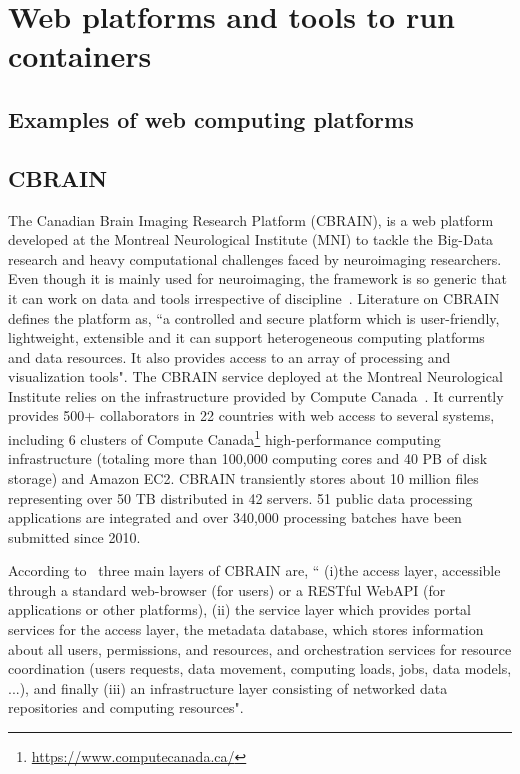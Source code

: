 \section{Web platforms and tools to run containers}
\subsection{Examples of web computing platforms}
\subsection{CBRAIN}
The Canadian Brain Imaging Research Platform (CBRAIN), is a web platform developed at the Montreal Neurological Institute (MNI) to tackle the Big-Data research and heavy computational challenges faced by neuroimaging researchers. Even though it is mainly used for neuroimaging, the framework is so generic that it can work on data and tools irrespective of discipline~\cite{DBLP:journals/fini/DasGRSPMSRSKMKR17}. Literature on CBRAIN~\cite{DBLP:journals/fini/DasGRSPMSRSKMKR17} defines the platform as, ``a controlled and secure platform which is user-friendly, lightweight, extensible and it can support heterogeneous computing platforms and data resources. It also provides access to an array of processing and visualization tools". The CBRAIN service deployed at the Montreal Neurological Institute relies on the infrastructure provided by Compute Canada~\cite{DAS20161188}. It currently provides 500+ collaborators in 22 countries with web access to several systems, including 6 clusters of Compute Canada\footnote{\url{https://www.computecanada.ca/}} high-performance computing infrastructure (totaling more than 100,000 computing cores and 40 PB of disk storage) and Amazon EC2. CBRAIN transiently stores about 10 million files representing over 50 TB distributed in 42 servers. 51 public data processing applications are integrated and over 340,000 processing batches have been submitted since 2010.

According to~\cite{DBLP:journals/fini/DasGRSPMSRSKMKR17} three main layers of CBRAIN are, `` (i)the access layer, accessible through a standard web-browser (for users) or a RESTful WebAPI (for applications or other platforms), (ii) the service layer which provides portal services for the access layer, the metadata database, which stores information about all users, permissions, and resources, and orchestration services for resource coordination (users requests, data movement, computing loads, jobs, data models, ...), and finally (iii) an infrastructure layer consisting of networked data repositories and computing resources".

